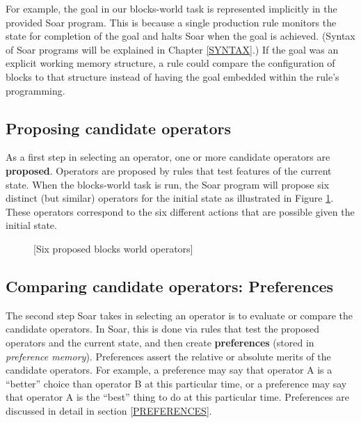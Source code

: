 For example, the goal in our blocks-world task is represented implicitly in the provided Soar program. This is because a single production rule monitors the state for completion of the goal and halts Soar when the goal is achieved. (Syntax of Soar programs will be explained in Chapter \ref{SYNTAX}.) If the goal was an explicit working memory structure, a rule could compare the configuration of blocks to that structure instead of having the goal embedded within the rule's programming.

\subsection{Proposing candidate operators}

As a first step in selecting an operator, one or more candidate operators are \textbf{proposed}.  Operators are proposed by rules that test features of the current state.  When the blocks-world task is run, the Soar program will propose six distinct (but similar) operators for the initial state as illustrated in Figure \ref{fig:proposal}. These operators correspond to the six different actions that are possible given the initial state.

\begin{figure}
	[Six proposed blocks world operators]
	\label{fig:proposal}
\end{figure}


\subsection{Comparing candidate operators: Preferences}

The second step Soar takes in selecting an operator is to evaluate or compare the candidate operators. In Soar, this is done via rules that test the proposed operators and the current state, and then create \textbf{preferences} (stored in \emph{preference memory}).  Preferences assert the relative or absolute merits of the candidate operators. For example, a preference may say that operator A is a ``better'' choice than operator B at this particular time, or a preference may say that operator A is the ``best'' thing to do at this particular time. Preferences are discussed in detail in section \ref{PREFERENCES}.

